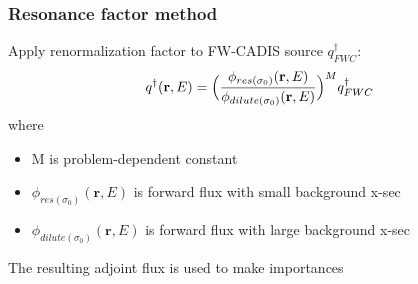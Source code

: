 \documentclass[xcolor=x11names,compress]{beamer}
\renewcommand{\(}{\begin{columns}}
\renewcommand{\)}{\end{columns}}
\newcommand{\<}[1]{\begin{column}{#1}}
\renewcommand{\>}{\end{column}}
\newcommand{\ve}[1]{\ensuremath{\mathbf{#1}}}
\newcommand{\micro}{\ensuremath{\sigma}}
\begin{document}
\begin{frame}[fragile]
  \frametitle{Resonance factor method \cite{Wilson2015}}
  	Apply renormalization factor to FW-CADIS source $q^{\dagger}_{FWC}$: 
	\begin{equation}
   	q^{\dagger}(\ve{r},E) = \Bigl(\frac{\phi_{res(\micro_0)}(\ve{r},E)}{\phi_{dilute(\micro_0)}(\ve{r},E)}\Bigr)^M q^{\dagger}_{FWC}  \nonumber
  	 \label{eq:newQ}
	\end{equation}
	where
	\begin{itemize}
  	\item M is problem-dependent constant 
 	 \item $\phi_{res(\micro_0)}(\ve{r},E)$ is forward flux with small background x-sec
 	 \item $\phi_{dilute(\micro_0)}(\ve{r},E)$ is forward flux with large background x-sec
	\end{itemize}
	\pause
	\vspace*{1 em}
	The resulting adjoint flux is used to make importances

	
	
	
	
\end{frame}


%  
%	
%  
\end{document}
